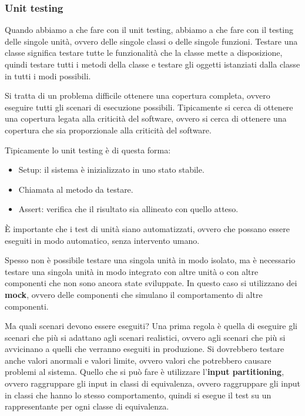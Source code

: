 \subsubsection{Unit testing}
Quando abbiamo a che fare con il unit testing, abbiamo a che fare con il testing
delle singole unità, ovvero delle singole classi o delle singole funzioni.
Testare una classe significa testare tutte le funzionalità che la classe 
mette a disposizione, quindi testare tutti i metodi della classe e testare 
gli oggetti istanziati dalla classe in tutti i modi possibili.

Si tratta di un problema difficile ottenere una copertura completa, ovvero eseguire tutti 
gli scenari di esecuzione possibili. Tipicamente si cerca di ottenere una copertura
legata alla criticità del software, ovvero si cerca di ottenere una copertura
che sia proporzionale alla criticità del software.

Tipicamente lo unit testing è di questa forma:
\begin{itemize}
    \item Setup: il sistema è inizializzato in uno stato stabile.
    \item Chiamata al metodo da testare.
    \item Assert: verifica che il risultato sia allineato con quello atteso.
\end{itemize}
\begin{tcolorbox}
    È importante che i test di unità siano automatizzati, ovvero che possano essere
    eseguiti in modo automatico, senza intervento umano.
\end{tcolorbox}
Spesso non è possibile testare una singola unità in modo isolato, ma è necessario
testare una singola unità in modo integrato con altre unità o con altre componenti 
che non sono ancora state sviluppate. In questo caso si utilizzano dei \textbf{mock},
ovvero delle componenti che simulano il comportamento di altre componenti.

Ma quali scenari devono essere eseguiti? Una prima regola è quella di eseguire
gli scenari che più si adattano agli scenari realistici, ovvero agli scenari che
più si avvicinano a quelli che verranno eseguiti in produzione. 
Si dovrebbero testare anche valori anormali e valori limite, ovvero valori che
potrebbero causare problemi al sistema.
Quello che si può fare è utilizzare l'\textbf{input partitioning}, ovvero
raggruppare gli input in classi di equivalenza, ovvero raggruppare gli input
in classi che hanno lo stesso comportamento, quindi si esegue il test su un
rappresentante per ogni classe di equivalenza.

